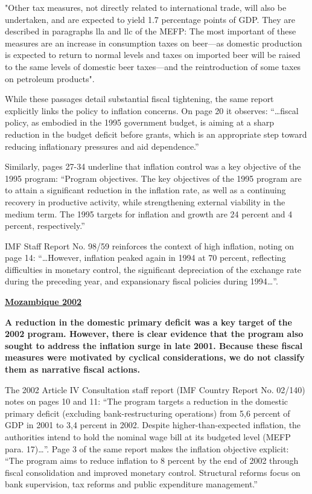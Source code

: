 "Other tax measures, not directly related to international trade, will also be undertaken, and are expected to yield 1.7 percentage points of GDP. They are described in paragraphs lla and llc of the MEFP: The most important of these measures are an increase in consumption taxes on beer—as domestic production is expected to return to normal levels and taxes on imported beer will be raised to the same levels of domestic beer taxes—and the reintroduction of some taxes on petroleum products".

While these passages detail substantial fiscal tightening, the same report explicitly links the policy to inflation concerns. On page 20 it observes: “…fiscal policy, as embodied in the 1995 government budget, is aiming at a sharp reduction in the budget deficit before grants, which is an appropriate step toward reducing inflationary pressures and aid dependence.”

Similarly, pages 27-34 underline that inflation control was a key objective of the 1995 program: “Program objectives. The key objectives of the 1995 program are to attain a significant reduction in the inflation rate, as well as a continuing recovery in productive activity, while strengthening external viability in the medium term. The 1995 targets for inflation and growth are 24 percent and 4 percent, respectively.”

IMF Staff Report No. 98/59 reinforces the context of high inflation, noting on page 14: “…However, inflation peaked again in 1994 at 70 percent, reflecting difficulties in monetary control, the significant depreciation of the exchange rate during the preceding year, and expansionary fiscal policies during 1994…”.

\textbf{\underline{Mozambique 2002}}

\textbf{A reduction in the domestic primary deficit was a key target of the 2002 program. However, there is clear evidence that the program also sought to address the inflation surge in late 2001. Because these fiscal measures were motivated by cyclical considerations, we do not classify them as narrative fiscal actions. }

The 2002 Article IV Consultation staff report (IMF Country Report No. 02/140) notes on pages 10 and 11: “The program targets a reduction in the domestic primary deficit (excluding bank-restructuring operations) from 5,6 percent of GDP in 2001 to 3,4 percent in 2002. Despite higher-than-expected inflation, the authorities intend to hold the nominal wage bill at its budgeted level (MEFP para. 17)…”. 
Page 3 of the same report makes the inflation objective explicit: “The program aims to reduce inflation to 8 percent by the end of 2002 through fiscal consolidation and improved monetary control. Structural reforms focus on bank supervision, tax reforms and public expenditure management.”

